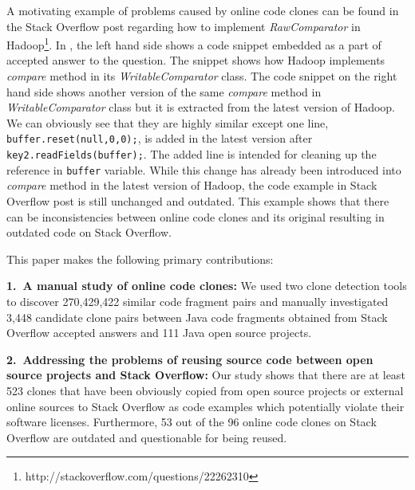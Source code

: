 \documentclass{sig-alternate-05-2015}
\begin{document}
A motivating example of problems caused by online code clones can be found in the Stack Overflow post regarding how to implement \textit{RawComparator} in Hadoop\footnote{http://stackoverflow.com/questions/22262310}. In , the left hand side shows a code snippet embedded as a part of accepted answer to the question. The snippet shows how Hadoop implements \textit{compare} method in its \textit{WritableComparator} class. The code snippet on the right hand side shows another version of the same \textit{compare} method in \textit{WritableComparator} class but it is extracted from the latest version of Hadoop. We can obviously see that they are highly similar except one line, \verb|buffer.reset(null,0,0);|, is added in the latest version after \verb|key2.readFields(buffer);|. The added line is intended for cleaning up the reference in \verb|buffer| variable. While this change has already been introduced into \textit{compare} method in the latest version of Hadoop, the code example in Stack Overflow post is still unchanged and outdated. This example shows that there can be inconsistencies between online code clones and its original resulting in outdated code on Stack Overflow.  %

This paper makes the following  primary contributions:

\vspace{0.5ex}%
\noindent\textbf{1.~A manual study of online code clones:} 
We used two clone detection tools to discover 270,429,422 similar code fragment pairs and manually investigated 3,448 candidate clone pairs between Java code fragments obtained from Stack Overflow accepted answers and 111 Java open source projects.

\vspace{0.5ex}%
\noindent\textbf{2.~Addressing the problems of reusing source code between open source projects and Stack Overflow:} Our study shows that there are at least 523 clones that have been obviously copied from open source projects or external online sources to Stack Overflow as code examples which potentially violate their software licenses. Furthermore, 53 out of the 96 online code clones on Stack Overflow are outdated and questionable for being reused.
\end{document}
